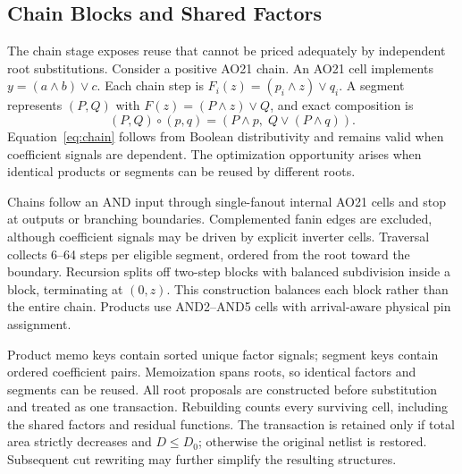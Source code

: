 \subsection{Chain Blocks and Shared Factors}\label{sec:chain}
The chain stage exposes reuse that cannot be priced adequately by independent root substitutions. Consider a positive AO21 chain. An AO21 cell implements $y=(a\wedge b)\vee c$. Each chain step is $F_i(z)=(p_i\wedge z)\vee q_i$. A segment represents $(P,Q)$ with $F(z)=(P\wedge z)\vee Q$, and exact composition is
\begin{equation}
 (P,Q)\circ(p,q)=(P\wedge p,\;Q\vee(P\wedge q)).\label{eq:chain}
\end{equation}
Equation~\eqref{eq:chain} follows from Boolean distributivity and remains valid when coefficient signals are dependent. The optimization opportunity arises when identical products or segments can be reused by different roots.

Chains follow an AND input through single-fanout internal AO21 cells and stop at outputs or branching boundaries. Complemented fanin edges are excluded, although coefficient signals may be driven by explicit inverter cells. Traversal collects 6--64 steps per eligible segment, ordered from the root toward the boundary. Recursion splits off two-step blocks with balanced subdivision inside a block, terminating at $(0,z)$. This construction balances each block rather than the entire chain. Products use AND2--AND5 cells with arrival-aware physical pin assignment.

Product memo keys contain sorted unique factor signals; segment keys contain ordered coefficient pairs. Memoization spans roots, so identical factors and segments can be reused. All root proposals are constructed before substitution and treated as one transaction. Rebuilding counts every surviving cell, including the shared factors and residual functions. The transaction is retained only if total area strictly decreases and $D\le D_0$; otherwise the original netlist is restored. Subsequent cut rewriting may further simplify the resulting structures.

